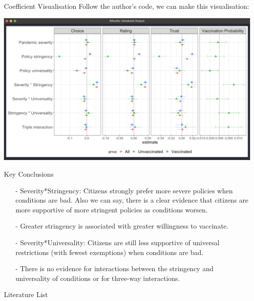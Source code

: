 \documentclass{beamer}
\begin{document}
\begin{frame}{Coefficient Visualisation}
\noindent Follow the author's code, we can make this visualisation:
\par
\includegraphics[width=1.05\textwidth]{reg_results.png}
\end{frame}

\begin{frame}{Key Conclusions}
\begin{itemize}
	\item[-] Severity*Stringency: Citizens strongly prefer more severe policies when conditions are bad. Also we can say, there is a clear evidence that citizens are more supportive of more stringent policies as conditions worsen.
	\item[-] Greater stringency is associated with greater willingness to vaccinate.
	\item[-] Severity*Universality: Citizens are still less supportive of universal restrictions (with fewest exemptions) when conditions are bad.
	\item[-] There is no evidence for interactions between the stringency and universality of conditions or for three-way interactions. 
\end{itemize}

\end{frame}



\begin{frame}{Literature List}


\end{frame}
\end{document}
